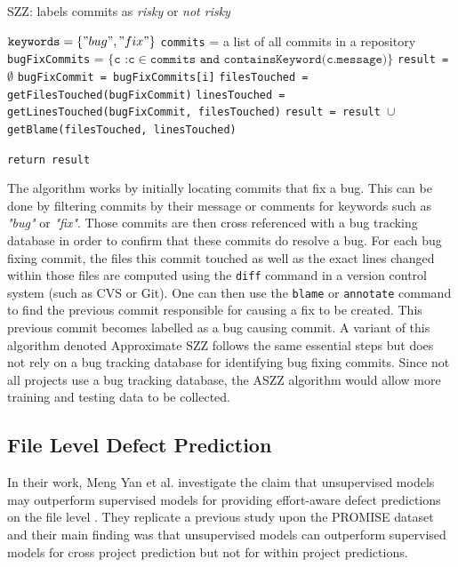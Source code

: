 \documentclass[../main.tex]{subfiles}
\begin{document}
\begin{algorithm}
\caption{SZZ: labels commits as \textit{risky} or \textit{not risky} \cite{sliwerski2005changes}}
\label{algorithm:szz}
    \begin{algorithmic}[1]
        \State $\texttt{keywords}=\{"bug","fix"\}$
        \State \texttt{commits} = a list of all commits in a repository
        \State \texttt{bugFixCommits} = $\{\texttt{c :c} \in \texttt{commits}\texttt{ and }\texttt{containsKeyword(c.message)}\}$ 
        \State \texttt{result =} $\emptyset$
                \State \texttt{bugFixCommit = bugFixCommits[i]}
                \State \texttt{filesTouched = getFilesTouched(bugFixCommit)}
                \State \texttt{linesTouched = getLinesTouched(bugFixCommit, filesTouched)}
                \State \texttt{result = result $\cup$ getBlame(filesTouched, linesTouched)}
        \EndFor
    
        \State \texttt{return result}
    \EndProcedure
    \end{algorithmic}
\end{algorithm}

The algorithm works by initially locating commits that fix a bug. This can be done by filtering commits by their message or comments for keywords such as \textit{"bug"} or \textit{"fix"}. Those commits are then cross referenced with a bug tracking database in order to confirm that these commits do resolve a bug. For each bug fixing commit, the files this commit touched as well as the exact lines changed within those files are computed using the \texttt{diff} command in a version control system (such as CVS or Git). One can then use the \texttt{blame} or \texttt{annotate} command to find the previous commit responsible for causing a fix to be created. This previous commit becomes labelled as a bug causing commit. A variant of this algorithm denoted Approximate SZZ follows the same essential steps but does not rely on a bug tracking database for identifying bug fixing commits. Since not all projects use a bug tracking database, the ASZZ algorithm would allow more training and testing data to be collected.

\subsection{File Level Defect Prediction }

In their work, Meng Yan et al. investigate the claim that unsupervised models may outperform supervised models for providing effort-aware defect predictions on the file level \cite{yan2017file}. They replicate a previous study upon the PROMISE dataset and their main finding was that unsupervised models can outperform supervised models for cross project prediction but not for within project predictions. 
\end{document}
